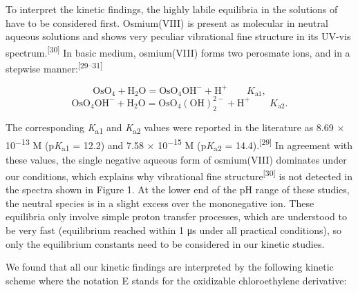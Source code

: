 \documentclass{article}
\begin{document}
To interpret the kinetic findings, the highly labile equilibria in the solutions of  have to be considered first. Osmium(VIII) is present as molecular  in neutral aqueous solutions and shows very peculiar vibrational fine structure in its UV-vis spectrum.\textsuperscript{[30]} In basic medium, osmium(VIII) forms two perosmate ions,  and  in a stepwise manner:\textsuperscript{[29–31]}

\begin{equation}
\mathrm{OsO_4 + H_2O = OsO_4OH^- + H^+} \qquad K_{\mathrm{a1}}, \tag{2}
\end{equation}
\begin{equation}
\mathrm{OsO_4OH^- + H_2O = OsO_4(OH)_2^{2-} + H^+} \qquad K_{\mathrm{a2}}. \tag{3}
\end{equation}

The corresponding \emph{K}\textsubscript{a1} and \emph{K}\textsubscript{a2} values were reported in the literature as 8.69 × 10\textsuperscript{−13} M (p\emph{K}\textsubscript{a1} = 12.2) and 7.58 × 10\textsuperscript{−15} M (p\emph{K}\textsubscript{a2} = 14.4).\textsuperscript{[29]} In agreement with these values, the single negative aqueous form of osmium(VIII) dominates under our conditions, which explains why vibrational fine structure\textsuperscript{[30]} is not detected in the spectra shown in Figure 1. At the lower end of the pH range of these studies, the neutral  species is in a slight excess over the mononegative ion. These equilibria only involve simple proton transfer processes, which are understood to be very fast (equilibrium reached within 1 μs under all practical conditions), so only the equilibrium constants need to be considered in our kinetic studies.

We found that all our kinetic findings are interpreted by the following kinetic scheme where the notation E stands for the oxidizable chloroethylene derivative:
\end{document}
